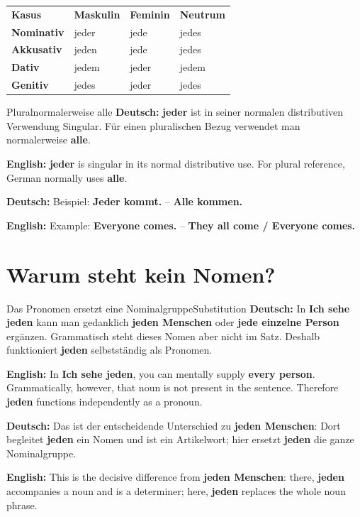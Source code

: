 \documentclass[a4paper,11pt]{article}
\newcommand{\GermanText}[1]{\textbf{Deutsch: }#1\par}
\newcommand{\EnglishText}[1]{{\small\color{SoftGray}\textbf{English: }#1\par}}
\begin{document}
\begin{longtable}{>{\bfseries}p{2.7cm}|>{\centering\arraybackslash}p{3.2cm}|>{\centering\arraybackslash}p{3.2cm}|>{\centering\arraybackslash}p{3.2cm}}
\rowcolor{HeaderBlueDark}
\color{white}\textbf{Kasus} &
\color{white}\textbf{Maskulin} &
\color{white}\textbf{Feminin} &
\color{white}\textbf{Neutrum} \\
Nominativ & jeder & jede & jedes \\
Akkusativ & jeden & jede & jedes \\
Dativ & jedem & jeder & jedem \\
Genitiv & jedes & jeder & jedes \\
\end{longtable}

\begin{grammarentry}{Plural}{normalerweise alle}
\GermanText{\textbf{jeder} ist in seiner normalen distributiven Verwendung Singular. Für einen pluralischen Bezug verwendet man normalerweise \textbf{alle}.}
\EnglishText{\textbf{jeder} is singular in its normal distributive use. For plural reference, German normally uses \textbf{alle}.}
\GermanText{Beispiel: \textbf{Jeder kommt.} -- \textbf{Alle kommen.}}
\EnglishText{Example: \textbf{Everyone comes.} -- \textbf{They all come / Everyone comes.}}
\end{grammarentry}

\section{Warum steht kein Nomen?}
\begin{grammarentry}{Das Pronomen ersetzt eine Nominalgruppe}{Substitution}
\GermanText{In \textbf{Ich sehe jeden} kann man gedanklich \textbf{jeden Menschen} oder \textbf{jede einzelne Person} ergänzen. Grammatisch steht dieses Nomen aber nicht im Satz. Deshalb funktioniert \textbf{jeden} selbstständig als Pronomen.}
\EnglishText{In \textbf{Ich sehe jeden}, you can mentally supply \textbf{every person}. Grammatically, however, that noun is not present in the sentence. Therefore \textbf{jeden} functions independently as a pronoun.}
\GermanText{Das ist der entscheidende Unterschied zu \textbf{jeden Menschen}: Dort begleitet \textbf{jeden} ein Nomen und ist ein Artikelwort; hier ersetzt \textbf{jeden} die ganze Nominalgruppe.}
\EnglishText{This is the decisive difference from \textbf{jeden Menschen}: there, \textbf{jeden} accompanies a noun and is a determiner; here, \textbf{jeden} replaces the whole noun phrase.}
\end{grammarentry}
\end{document}
